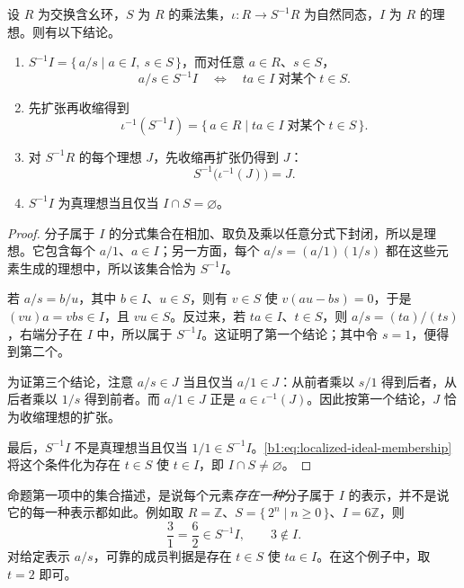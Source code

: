 \begin{proposition}\label{b1:prop:localization-ideal-correspondence}
	设 \(R\) 为交换含幺环，\(S\) 为 \(R\) 的乘法集，\(\iota:R\rightarrow S^{-1}R\) 为自然同态，\(I\) 为 \(R\) 的理想。则有以下结论。
	\begin{enumerate}
		\item \(S^{-1}I=\{\,a/s\mid a\in I,\ s\in S\,\}\)，而对任意 \(a\in R\)、\(s\in S\)，
			\begin{equation}\label{b1:eq:localized-ideal-membership}
				a/s\in S^{-1}I \quad\Longleftrightarrow\quad ta\in I\;\text{对某个}\;t\in S.
			\end{equation}
		\item 先扩张再收缩得到
			\begin{equation}\label{b1:eq:localized-ideal-contraction}
				\iota^{-1}(S^{-1}I) =\{\,a\in R\mid ta\in I\;\text{对某个}\;t\in S\,\}.
			\end{equation}
		\item 对 \(S^{-1}R\) 的每个理想 \(J\)，先收缩再扩张仍得到 \(J\)：
			\[
				S^{-1}\bigl(\iota^{-1}(J)\bigr)=J.
			\]
		\item \(S^{-1}I\) 为真理想当且仅当 \(I\cap S=\varnothing\)。
	\end{enumerate}
\end{proposition}
\begin{proof}
	分子属于 \(I\) 的分式集合在相加、取负及乘以任意分式下封闭，所以是理想。它包含每个 \(a/1\)、\(a\in I\)；另一方面，每个 \(a/s=(a/1)(1/s)\) 都在这些元素生成的理想中，所以该集合恰为 \(S^{-1}I\)。

	若 \(a/s=b/u\)，其中 \(b\in I\)、\(u\in S\)，则有 \(v\in S\) 使 \(v(au-bs)=0\)，于是 \((vu)a=vbs\in I\)，且 \(vu\in S\)。反过来，若 \(ta\in I\)、\(t\in S\)，则 \(a/s=(ta)/(ts)\)，右端分子在 \(I\) 中，所以属于 \(S^{-1}I\)。这证明了第一个结论；其中令 \(s=1\)，便得到第二个。

	为证第三个结论，注意 \(a/s\in J\) 当且仅当 \(a/1\in J\)：从前者乘以 \(s/1\) 得到后者，从后者乘以 \(1/s\) 得到前者。而 \(a/1\in J\) 正是 \(a\in\iota^{-1}(J)\)。因此按第一个结论，\(J\) 恰为收缩理想的扩张。

	最后，\(S^{-1}I\) 不是真理想当且仅当 \(1/1\in S^{-1}I\)。\eqref{b1:eq:localized-ideal-membership}将这个条件化为存在 \(t\in S\) 使 \(t\in I\)，即 \(I\cap S\neq\varnothing\)。
\end{proof}

命题第一项中的集合描述，是说每个元素\emph{存在一种}分子属于 \(I\) 的表示，并不是说它的每一种表示都如此。例如取 \(R=\mathbb Z\)、\(S=\{\,2^n\mid n\geq0\,\}\)、\(I=6\mathbb Z\)，则
\[
	\frac31=\frac62\in S^{-1}I, \qquad 3\notin I.
\]
对给定表示 \(a/s\)，可靠的成员判据是存在 \(t\in S\) 使 \(ta\in I\)。在这个例子中，取 \(t=2\) 即可。

